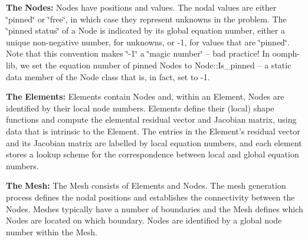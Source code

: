 \begin{DoxyItemize}
\item {\bfseries The} {\bfseries Nodes\-:} Nodes have positions and values. The nodal values are either \char`\"{}pinned\char`\"{} or \char`\"{}free\char`\"{}, in which case they represent unknowns in the problem. The \char`\"{}pinned status\char`\"{} of a Node is indicated by its global equation number, either a unique non-\/negative number, for unknowns, or -\/1, for values that are \char`\"{}pinned\char`\"{}. Note that this convention makes \char`\"{}-\/1\char`\"{} a \char`\"{}magic number\char`\"{} -- bad practice! In {\ttfamily oomph-\/lib}, we set the equation number of pinned Nodes to {\ttfamily Node\-::\-Is\-\_\-pinned} -- a static data member of the Node class that is, in fact, set to -\/1.
\item {\bfseries The} {\bfseries Elements\-:} Elements contain Nodes and, within an Element, Nodes are identified by their local node numbers. Elements define their (local) shape functions and compute the elemental residual vector and Jacobian matrix, using data that is intrinsic to the Element. The entries in the Element's residual vector and its Jacobian matrix are labelled by local equation numbers, and each element stores a lookup scheme for the correspondence between local and global equation numbers.
\item {\bfseries The} {\bfseries Mesh\-:} The Mesh consists of Elements and Nodes. The mesh generation process defines the nodal positions and establishes the connectivity between the Nodes. Meshes typically have a number of boundaries and the Mesh defines which Nodes are located on which boundary. Nodes are identified by a global node number within the Mesh.
\end{DoxyItemize}

